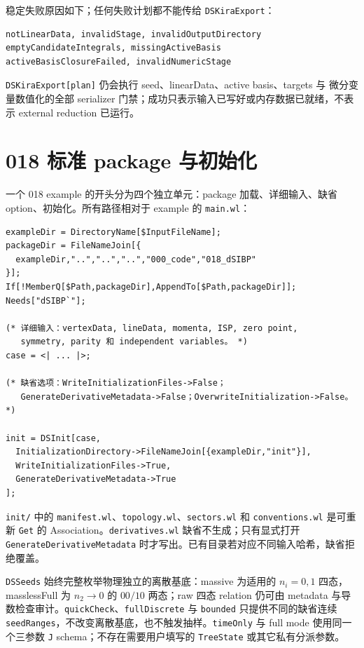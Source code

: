 ﻿\documentclass[a4paper,11pt]{article}
\begin{document}
稳定失败原因如下；任何失败计划都不能传给 \texttt{DSKiraExport}：
\begin{verbatim}
notLinearData, invalidStage, invalidOutputDirectory
emptyCandidateIntegrals, missingActiveBasis
activeBasisClosureFailed, invalidNumericStage
\end{verbatim}
\texttt{DSKiraExport[plan]} 仍会执行 seed、linearData、active basis、targets 与
微分变量数值化的全部 serializer 门禁；成功只表示输入已写好或内存数据已就绪，不表示
external reduction 已运行。

\section{018 标准 package 与初始化}

一个 018 example 的开头分为四个独立单元：package 加载、详细输入、缺省 option、初始化。所有路径相对于 example 的 \texttt{main.wl}：
\begin{verbatim}
exampleDir = DirectoryName[$InputFileName];
packageDir = FileNameJoin[{
  exampleDir,"..","..","..","000_code","018_dSIBP"
}];
If[!MemberQ[$Path,packageDir],AppendTo[$Path,packageDir]];
Needs["dSIBP`"];

(* 详细输入：vertexData, lineData, momenta, ISP, zero point,
   symmetry, parity 和 independent variables。 *)
case = <| ... |>;

(* 缺省选项：WriteInitializationFiles->False；
   GenerateDerivativeMetadata->False；OverwriteInitialization->False。 *)

init = DSInit[case,
  InitializationDirectory->FileNameJoin[{exampleDir,"init"}],
  WriteInitializationFiles->True,
  GenerateDerivativeMetadata->True
];
\end{verbatim}

\texttt{init/} 中的 \texttt{manifest.wl}、\texttt{topology.wl}、\texttt{sectors.wl} 和 \texttt{conventions.wl} 是可重新 \texttt{Get} 的 Association。\texttt{derivatives.wl} 缺省不生成；只有显式打开 \texttt{GenerateDerivativeMetadata} 时才写出。已有目录若对应不同输入哈希，缺省拒绝覆盖。

\texttt{DSSeeds} 始终完整枚举物理独立的离散基底：massive 为适用的 $n_i=0,1$ 四态，masslessFull 为 $n_2\to0$ 的 $00/10$ 两态；raw 四态 relation 仍可由 metadata 与导数检查审计。\texttt{quickCheck}、\texttt{fullDiscrete} 与 \texttt{bounded} 只提供不同的缺省连续 \texttt{seedRanges}，不改变离散基底，也不触发抽样。\texttt{timeOnly} 与 full mode 使用同一个三参数 \texttt{J} schema；不存在需要用户填写的 \texttt{TreeState} 或其它私有分派参数。
\end{document}
